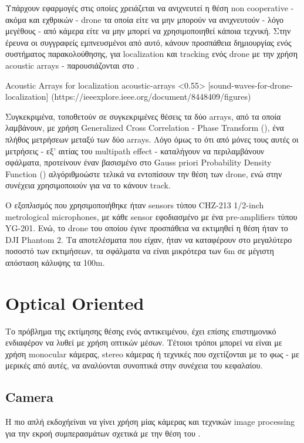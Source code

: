 Υπάρχουν εφαρμογές στις οποίες χρειάζεται να ανιχνευτεί η θέση non cooperative - ακόμα και εχθρικών - drone τα οποία είτε να μην μπορούν να ανιχνευτούν - λόγο μεγέθους - από κάμερα είτε να μην μπορεί να χρησιμοποιηθεί κάποια  τεχνική.
Στην έ\-ρ\-ευ\-να \cite{sound-waves-for-drone-localization} οι συγγραφείς εμπνευσμένοι από αυτό, κάνουν προσπάθεια δημιουργίας ενός συστήματος παρακολούθησης, για localization και tracking ενός drone με την χρήση acoustic arrays - παρουσιάζονται στο . 

%
{Acoustic Arrays for localization}%
{acoustic-arrays}%
<0.55>%
[sound-waves-for-drone-localization]%
(https://ieeexplore.ieee.org/document/8448409/figures)

Συγκεκριμένα, τοποθετούν σε συγκεκριμένες θέσεις τα δύο arrays, από τα οποία λα\-μβά\-νουν, με χρήση Generalized Cross Correlation - Phase Transform (), ένα πλήθος μετρήσεων  μεταξύ των δύο arrays. Λόγο όμως το ότι από μόνες τους αυτές οι
μετρήσεις - εξ' αιτίας του multipath effect - καταλήγουν να περιλαμβάνουν σφάλματα, προτείνουν έναν βασισμένο στο Gauss
priori Probability Density Function () αλγόριθμο\udot ώστε τελικά να εντοπίσουν την θέση των drone, ενώ στην συνέχεια χρησιμοποιούν  για να το κάνουν track.

Ο εξοπλισμός που χρησιμοποιήθηκε ήταν sensors τύπου CHZ-213 1/2-inch me\-tro\-lo\-gi\-cal microphones, με κάθε sensor εφοδιασμένο με ένα pre-amplifiers τύπου YG-201. Ενώ, το drone του οποίου έγινε προσπάθεια να εκτιμηθεί η θέση ήταν το DJI Pha\-ntom 2. Τα αποτελέσματα που είχαν, ήταν να καταφέρουν στο μεγαλύτερο ποσοστό των εκτιμήσεων, τα σφάλματα να είναι μικρότερα των 6m σε μέγιστη απόσταση κάλυψης τα 100m.  

\section{Optical Oriented} \label{sec:related-optical}
Το πρόβλημα της εκτίμησης θέσης ενός αντικειμένου, έχει επίσης επιστημονικό ε\-νδια\-φέ\-ρον να λυθεί με χρήση οπτικών μέσων. Τέτοιοι τρόποι μπορεί να είναι με χρήση mo\-no\-cu\-lar κάμερας, stereo κάμερας ή τεχνικές που σχετίζονται με το φως - με μερικές από αυτές, να αναλύονται συνοπτικά στην συνέχεια του κεφαλαίου.

\subsection{Camera} \label{sec:related-camera}
H πιο απλή εκδοχή\udot είναι να γίνει χρήση μίας κάμερας και τεχνικών image processing για την εκροή συμπερασμάτων σχετικά με την θέση του .


